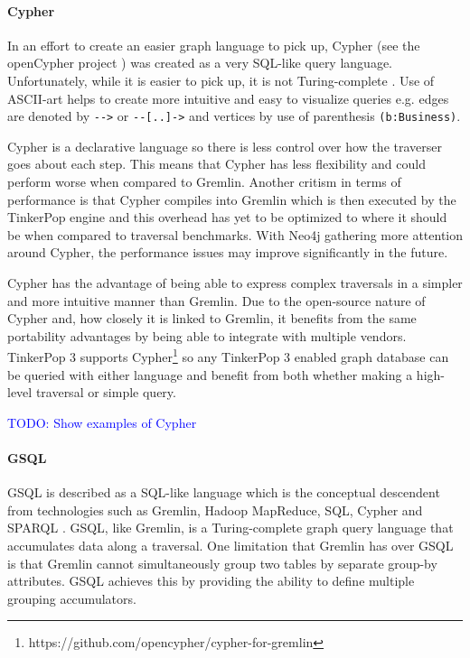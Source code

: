 \paragraph{Cypher}

In an effort to create an easier graph language to pick up, Cypher (see the openCypher project \cite{opencypher}) was created as a very SQL-like query language. Unfortunately, while it is easier to pick up, it is not Turing-complete \cite{modern-graph-query-lang}. Use of ASCII-art helps to create more intuitive and easy to visualize queries e.g. edges are denoted by \verb|-->| or \verb|--[..]->| and vertices by use of parenthesis \verb|(b:Business)|. 

Cypher is a declarative language so there is less control over how the traverser goes about each step. This means that Cypher has less flexibility and could perform worse when compared to Gremlin. Another critism in terms of performance is that Cypher compiles into Gremlin which is then executed by the TinkerPop engine \cite{backtothefuture} and this overhead has yet to be optimized to where it should be when compared to traversal benchmarks. With Neo4j gathering more attention around Cypher, the performance issues may improve significantly in the future.

Cypher has the advantage of being able to express complex traversals in a simpler and more intuitive manner than Gremlin. Due to the open-source nature of Cypher and, how closely it is linked to Gremlin, it benefits from the same portability advantages by being able to integrate with multiple vendors. TinkerPop 3 supports Cypher\footnote{https://github.com/opencypher/cypher-for-gremlin} so any TinkerPop 3 enabled graph database can be queried with either language and benefit from both whether making a high-level traversal or simple query.

\textcolor{blue}{TODO: Show examples of Cypher}

\paragraph{GSQL}

GSQL is described as a SQL-like language which is the conceptual descendent from technologies such as Gremlin, Hadoop MapReduce, SQL, Cypher and SPARQL \cite{gsql-tigergraph}. GSQL, like Gremlin, is a Turing-complete graph query language that accumulates data along a traversal. One limitation that Gremlin has over GSQL is that Gremlin cannot simultaneously group two tables by separate group-by attributes. GSQL achieves this by providing the ability to define multiple grouping accumulators.

